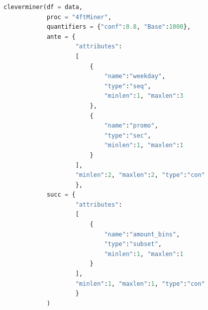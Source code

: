 \begin{lstlisting}[language=Python, style=mystyle, label={code:cleverminerH1}, caption={Hypotéza č. 1, funkce \texttt{cleverminer}.}]
cleverminer(df = data,
            proc = "4ftMiner", 
            quantifiers = {"conf":0.8, "Base":1000},
            ante = {
                    "attributes":
                    [
                        {
                            "name":"weekday", 
                            "type":"seq", 
                            "minlen":1, "maxlen":3
                        },
                        {
                            "name":"promo", 
                            "type":"sec", 
                            "minlen":1, "maxlen":1
                        }
                    ], 
                    "minlen":2, "maxlen":2, "type":"con"
                    },
            succ = {
                    "attributes":
                    [
                        {
                            "name":"amount_bins", 
                            "type":"subset", 
                            "minlen":1, "maxlen":1
                        }
                    ], 
                    "minlen":1, "maxlen":1, "type":"con"
                    }
            )
    \end{lstlisting}

